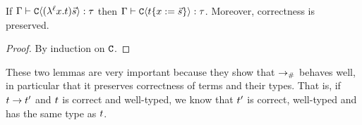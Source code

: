 \begin{lemma}
If $\Gamma \vdash \mathtt{C}\langle(\lambda^{\ell} x. t) \vec{s}\rangle : \tau$
then $\Gamma \vdash \mathtt{C}\langle t\{x := \vec{s}\}\rangle : \tau$.
Moreover, correctness is preserved.
\end{lemma}
\begin{proof}
 By induction on $\mathtt{C}$.
\end{proof}

These two lemmas are very important because they show that $\mathrel{\to_{\mathtt{\#}}}$ behaves
well, in particular that it preserves correctness of terms and their types.
That is, if $t \to t'$ and $t$ is correct and well-typed,
we know that $t'$ is correct, well-typed and has the same type as $t$.
